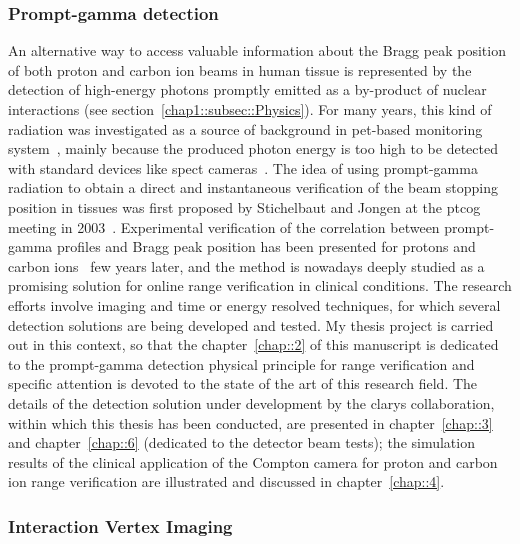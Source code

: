 \subsubsection{Prompt-gamma detection}\label{chap1::subsec::PGgeneral}
An alternative way to access valuable information about the Bragg peak position of both proton and carbon ion beams in human tissue is represented by the detection of high-energy photons promptly emitted as a by-product of nuclear interactions (see section~\ref{chap1::subsec::Physics}). For many years, this kind of radiation was investigated as a source of background in \gls{pet}-based monitoring system~\parencite{Parodi2005}, mainly because the produced photon energy is too high to be detected with standard devices like \gls{spect} cameras~\parencite{Kraan2015b}. The idea of using prompt-gamma radiation to obtain a direct and instantaneous verification of the beam stopping position in tissues was first proposed by Stichelbaut and Jongen at the  \gls{ptcog} meeting in 2003~\parencite{Stichelbaut2003}. Experimental verification of the correlation between prompt-gamma profiles and Bragg peak position has been presented for protons and carbon ions~\parencite{Min2006, Testa2008} few years later, and the method is nowadays deeply studied as a promising solution for online range verification in clinical conditions. The research efforts involve imaging and time or energy resolved techniques, for which several detection solutions are being developed and tested. 
My thesis project is carried out in this context, so that the chapter~\ref{chap::2} of this manuscript is dedicated to the prompt-gamma detection physical principle for range verification and specific attention is devoted to the state of the art of this research field. The details of the detection solution under development by the \gls{clarys} collaboration, within which this thesis has been conducted, are presented in chapter~\ref{chap::3} and chapter~\ref{chap::6} (dedicated to the detector beam tests); the simulation results of the clinical application of the Compton camera for proton and carbon ion range verification are illustrated and discussed in chapter~\ref{chap::4}.   


\subsubsection{Interaction Vertex Imaging}\label{chap1::subsec::IVI}

